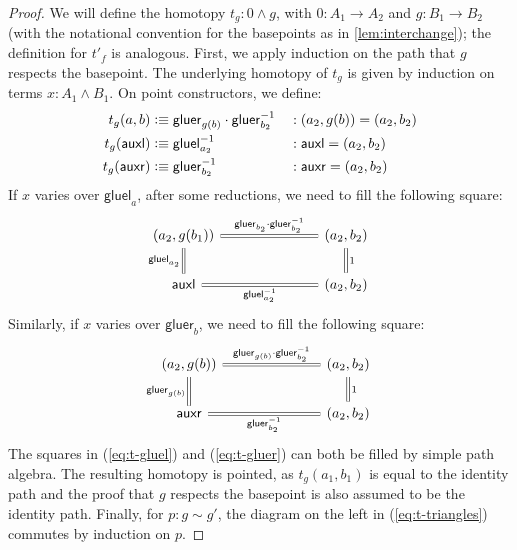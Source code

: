 \documentclass{article}
\newcommand{\smsh}{\wedge}
\newcommand{\tr}{\cdot}
\newcommand{\auxl}{\mathsf{auxl}}
\newcommand{\auxr}{\mathsf{auxr}}
\newcommand{\gluel}{\mathsf{gluel}}
\newcommand{\gluer}{\mathsf{gluer}}
\newcommand{\sy}{^{-1}}
\begin{document}
\begin{proof}
	We will define the homotopy $t_g : 0 \smsh g$, with $0 : A_1 \to A_2$ and $g : B_1 \to B_2$ (with the notational convention for the basepoints as in \autoref{lem:interchange}); the definition for $t'_f$ is analogous. First, we apply induction on the path that $g$ respects the basepoint. The underlying homotopy of $t_g$ is given by induction on terms $x : A_1 \smsh B_1$. On point constructors, we define:
	\begin{align*}
	t_g (a,b) &\defeq \gluer_{g(b)} \tr \gluer_{b_2}\sy && : (a_2, g(b)) = (a_2, b_2)\\
	t_g (\auxl) &\defeq \gluel_{a_2}\sy && : \auxl = (a_2, b_2)\\
	t_g (\auxr) &\defeq \gluer_{b_2}\sy && : \auxr = (a_2, b_2)
	\end{align*}
	If $x$ varies over $\gluel_a$, after some reductions, we need to fill the following square:
	\begin{equation}\label{eq:t-gluel}
	\begin{tikzcd}[column sep=7em]
		(a_2, g(b_1))
			\arrow[r,equals,"\gluer_{b_2} \tr \gluer_{b_2}\sy"]
			\arrow[d,swap,equals, "\gluel_{a_2}"]
		& (a_2, b_2)
			\arrow[d,equals,"1"]
		\\
		\auxl
			\arrow[r,swap,equals, "\gluel_{a_2}\sy"]
		& (a_2, b_2)
	\end{tikzcd}
	\end{equation}
	Similarly, if $x$ varies over $\gluer_b$, we need to fill the following square:
	\begin{equation}\label{eq:t-gluer}
	\begin{tikzcd}[column sep=7em]
		(a_2, g(b))
			\arrow[r,equals,"\gluer_{g(b)} \tr \gluer_{b_2}\sy"]
			\arrow[d,swap,equals, "\gluer_{g(b)}"]
		& (a_2, b_2)
			\arrow[d,equals,"1"]
		\\
		\auxr
			\arrow[r,swap,equals, "\gluer_{b_2}\sy"]
		& (a_2, b_2)
	\end{tikzcd}
	\end{equation}
	The squares in (\ref{eq:t-gluel}) and (\ref{eq:t-gluer}) can both be filled by simple path algebra. The resulting homotopy is pointed, as $t_g(a_1,b_1)$ is equal to the identity path and the proof that $g$ respects the basepoint is also assumed to be the identity path. Finally, for $p : g \sim g'$, the diagram on the left in (\ref{eq:t-triangles}) commutes by induction on $p$.
\end{proof}
\end{document}
